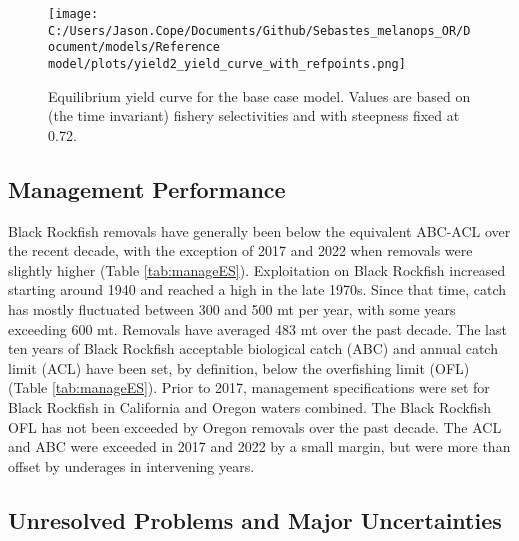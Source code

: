 \documentclass[11pt,
  english,
  letterpaper,
]{article}
\begin{document}
\begin{figure}
\centering
\texttt{[image: C:/Users/Jason.Cope/Documents/Github/Sebastes\_melanops\_OR/Document/models/Reference model/plots/yield2\_yield\_curve\_with\_refpoints.png]}
\caption{Equilibrium yield curve for the base case model. Values are based on (the time invariant) fishery selectivities and with steepness fixed at 0.72.\label{fig:es-yield}}
\end{figure}

\clearpage



\clearpage

\hypertarget{management-performance}{%
\subsection*{Management Performance}\label{management-performance}}

Black Rockfish removals have generally been below the equivalent ABC-ACL over the recent decade, with the exception of 2017 and 2022 when removals were slightly higher (Table \ref{tab:manageES}). Exploitation on Black Rockfish increased starting around 1940 and reached a high in the late 1970s. Since that time, catch has mostly fluctuated between 300 and 500 mt per year, with some years exceeding 600 mt. Removals have averaged 483 mt over the past decade. The last ten years of Black Rockfish acceptable biological catch (ABC) and annual catch limit (ACL) have been set, by definition, below the overfishing limit (OFL) (Table \ref{tab:manageES}). Prior to 2017, management specifications were set for Black Rockfish in California and Oregon waters combined. The Black Rockfish OFL has not been exceeded by Oregon removals over the past decade. The ACL and ABC were exceeded in 2017 and 2022 by a small margin, but were more than offset by underages in intervening years.



\hypertarget{unresolved-problems-and-major-uncertainties}{%
\subsection*{Unresolved Problems and Major Uncertainties}\label{unresolved-problems-and-major-uncertainties}}
\end{document}
